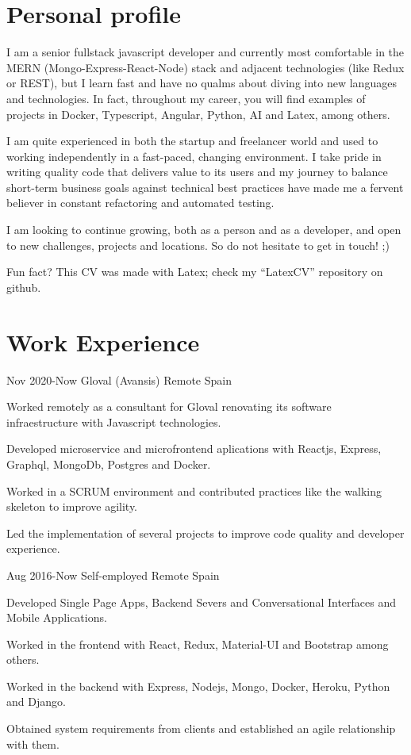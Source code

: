 \documentclass[10pt]{CurriculumVitae}
\begin{document}
  \makeheading


  \section{Personal profile}
    {
      I am a senior fullstack javascript developer and currently most comfortable in the MERN (Mongo-Express-React-Node) stack and adjacent technologies (like Redux or REST), but I learn fast and have no qualms about diving into new languages and technologies. In fact, throughout my career, you will find examples of projects in Docker, Typescript, Angular, Python, AI and Latex, among others.
      
      I am quite experienced in both the startup and freelancer world and used to working independently in a fast-paced, changing environment. I take pride in writing quality code that delivers value to its users and my journey to balance short-term business goals against technical best practices have made me a fervent believer in constant refactoring and automated testing.

      I am looking to continue growing, both as a person and as a developer, and open to new challenges, projects and locations. So do not hesitate to get in touch! ;) 
      
      \null\hfill {\scriptsize Fun fact? This CV was made with Latex; check my ``LatexCV'' repository on github.}
    }


  \section{Work Experience}
    {Nov 2020-Now}
    {Gloval (Avansis)}
    {Remote}
    {Spain}
    {
      \item Worked remotely as a consultant for Gloval renovating its software infraestructure with Javascript technologies.
      \item Developed microservice and microfrontend aplications with Reactjs, Express, Graphql, MongoDb, Postgres and Docker.
      \item Worked in a SCRUM environment and contributed practices like the walking skeleton to improve agility.
      \item Led the implementation of several projects to improve code quality and developer experience. %
    }
 
      {Aug 2016-Now}
      {Self-employed}
      {Remote}
      {Spain}
      {
        \item Developed Single Page Apps, Backend Severs and Conversational Interfaces and Mobile Applications.
        \item Worked in the frontend with React, Redux, Material-UI and Bootstrap among others.
        \item Worked in the backend with Express, Nodejs, Mongo, Docker, Heroku, Python and Django.
        \item Obtained system requirements from clients and established an agile relationship with them.
      }
\end{document}
